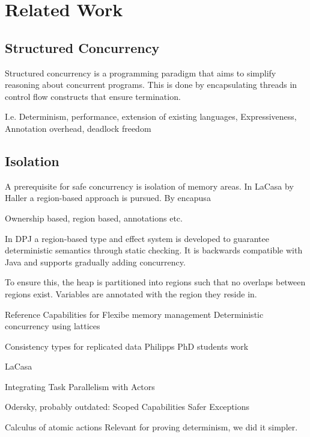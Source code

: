 \chapter{Related Work}

\section{Structured Concurrency}
Structured concurrency is a programming paradigm that aims to simplify reasoning about concurrent programs. This is done by encapsulating threads in control flow constructs that ensure termination. 


I.e. Determinism, performance, extension of existing languages, Expressiveness, Annotation overhead, deadlock freedom

\section{Isolation}
A prerequisite for safe concurrency is isolation of memory areas. In LaCasa  by Haller a region-based approach is pursued. By encapusa


Ownership based, region based, annotations etc.


In DPJ  a region-based type and effect system is developed to guarantee deterministic semantics through static checking. It is backwards compatible with Java and supports gradually adding concurrency.

To ensure this, the heap is partitioned into regions such that no overlaps between regions exist. Variables are annotated with the region they reside in.


Reference Capabilities for Flexibe memory management
Deterministic concurrency using lattices

Consistency types for replicated data
Philipps PhD students work

LaCasa

Integrating Task Parallelism with Actors


Odersky, probably outdated:
Scoped Capabilities
Safer Exceptions

Calculus of atomic actions
Relevant for proving determinism, we did it simpler.
